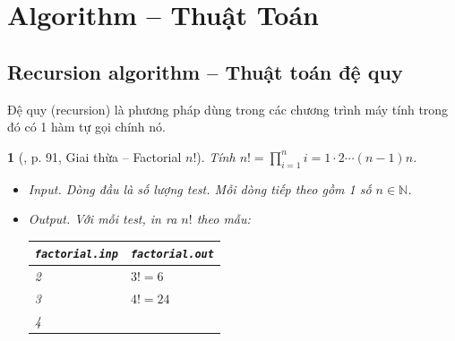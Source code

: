 \documentclass{article}
\newtheorem{baitoan}{}
\begin{document}

\section{Algorithm -- Thuật Toán}

\subsection{Recursion algorithm -- Thuật toán đệ quy}
Đệ quy (recursion) là phương pháp dùng trong các chương trình máy tính trong đó có 1 hàm tự gọi chính nó.

\begin{baitoan}[\cite{VietSTEM2021}, p. 91, Giai thừa -- Factorial $n!$]
	Tính $n! = \prod_{i=1}^n i = 1\cdot2\cdots(n - 1)n$.
	\begin{itemize}
		\item {\sf Input.} Dòng đầu là số lượng test. Mỗi dòng tiếp theo gồm 1 số $n\in\mathbb{N}$.
		\item {\sf Output.} Với mỗi test, in ra $n!$ theo mẫu:
		\begin{table}[H]
			\centering
			\begin{tabular}{|l|l|}
				\hline
				{\tt factorial.inp} & {\tt factorial.out} \\
				\hline
				2 & $3! = 6$ \\
				3 & $4! = 24$ \\
				4 &  \\
				\hline
			\end{tabular}
		\end{table}
	\end{itemize}
\end{baitoan}
\end{document}
